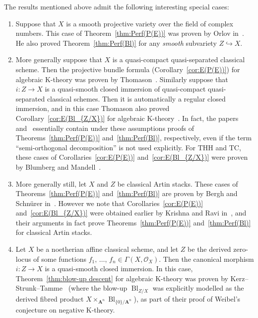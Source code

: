 \documentclass[11pt]{article}
\theoremstyle{definition}
\numberwithin{equation}{section}
\numberwithin{figure}{section}
\numberwithin{table}{section}
\DeclareMathOperator*{\fibprod}{\times}
\newcommand{\sO}{\ensuremath{\mathcal{O}}\xspace}
\newcommand{\bA}{\ensuremath{\mathbf{A}}\xspace}
\newcommand{\hook}{\hookrightarrow}
\newcommand{\A}{\bA}
\DeclareMathOperator{\Bl}{Bl}
\newcommand{\mrm}[1]{\ensuremath{\mathrm{#1}}\xspace}
\begin{document}
The results mentioned above admit the following interesting special cases:
\begin{enumerate}
\item Suppose that $X$ is a smooth projective variety over the field of complex numbers. This case of Theorem~\ref{thm:Perf(P(E))} was proven by Orlov in~\cite{OrlovSOD}. He also proved Theorem~\ref{thm:Perf(Bl)} for any \emph{smooth} subvariety $Z \hook X$.
\item More generally suppose that $X$ is a quasi-compact quasi-separated classical scheme. Then the projective bundle formula (Corollary~\ref{cor:E(P(E))}) for algebraic K-theory was proven by Thomason~\cite{ThomasonProjectiveBundle,ThomasonTrobaugh}. Similarly suppose that $i : Z \to X$ is a quasi-smooth closed immersion of quasi-compact quasi-separated classical schemes. Then it is automatically a regular closed immersion, and in this case Thomason also proved Corollary~\ref{cor:E(Bl_{Z/X})} for algebraic K-theory~\cite{ThomasonBlowup}. In fact, the papers~\cite{ThomasonProjectiveBundle} and~\cite{ThomasonBlowup} essentially contain under these assumptions proofs of Theorems~\ref{thm:Perf(P(E))} and~\ref{thm:Perf(Bl)}, respectively, even if the term ``semi-orthogonal decomposition'' is not used explicitly. For $\mrm{THH}$ and $\mrm{TC}$, these cases of Corollaries~\ref{cor:E(P(E))} and~\ref{cor:E(Bl_{Z/X})} were proven by Blumberg and Mandell~\cite{BlumbergMandellTHH}.

\item More generally still, let $X$ and $Z$ be classical Artin stacks. These cases of Theorems~\ref{thm:Perf(P(E))} and~\ref{thm:Perf(Bl)} are proven by Bergh and Schn\"urer in~\cite{BerghSchnuerer}. However we note that Corollaries~\ref{cor:E(P(E))} and~\ref{cor:E(Bl_{Z/X})} were obtained earlier by Krishna and Ravi in~\cite{KrishnaRavi}, and their arguments in fact prove Theorems~\ref{thm:Perf(P(E))} and~\ref{thm:Perf(Bl)} for classical Artin stacks.

\item Let $X$ be a noetherian affine classical scheme, and let $Z$ be the derived zero-locus of some functions $f_1,\,\ldots,\,f_n \in \Gamma(X, \sO_X)$. Then the canonical morphism $i : Z \to X$ is a quasi-smooth closed immersion. In this case, Theorem~\ref{thm:blow-up descent} for algebraic K-theory was proven by Kerz--Strunk--Tamme~\cite{KerzStrunkTamme} (where the blow-up $\Bl_{Z/X}$ was explicitly modelled as the derived fibred product $X \fibprod_{\A^n} \Bl_{\{0\}/\A^n}$), as part of their proof of Weibel's conjecture on negative K-theory.
\end{enumerate}
\end{document}
